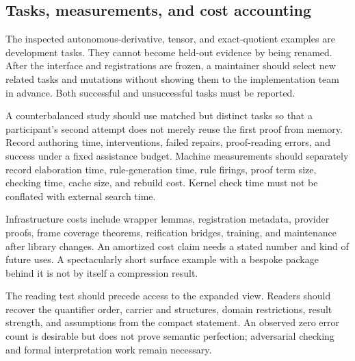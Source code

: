\documentclass[11pt,letterpaper]{article}
\theoremstyle{definition}\newtheorem{definition}[theorem]{Definition}
\theoremstyle{remark}\newtheorem{remark}[theorem]{Remark}
\begin{document}
\subsection{Tasks, measurements, and cost accounting}
The inspected autonomous-derivative, tensor, and exact-quotient examples are
development tasks. They cannot become held-out evidence by being renamed.
After the interface and registrations are frozen, a maintainer should select
new related tasks and mutations without showing them to the implementation
team in advance. Both successful and unsuccessful tasks must be reported.

A counterbalanced study should use matched but distinct tasks so that a
participant's second attempt does not merely reuse the first proof from memory.
Record authoring time, interventions, failed repairs, proof-reading errors,
and success under a fixed assistance budget. Machine measurements should
separately record elaboration time, rule-generation time, rule firings, proof
term size, checking time, cache size, and rebuild cost. Kernel check time must
not be conflated with external search time.

Infrastructure costs include wrapper lemmas, registration metadata, provider
proofs, frame coverage theorems, reification bridges, training, and maintenance
after library changes. An amortized cost claim needs a stated number and kind
of future uses. A spectacularly short surface example with a bespoke package
behind it is not by itself a compression result.

The reading test should precede access to the expanded view. Readers should
recover the quantifier order, carrier and structures, domain restrictions,
result strength, and assumptions from the compact statement. An observed zero
error count is desirable but does not prove semantic perfection; adversarial
checking and formal interpretation work remain necessary.
\end{document}
